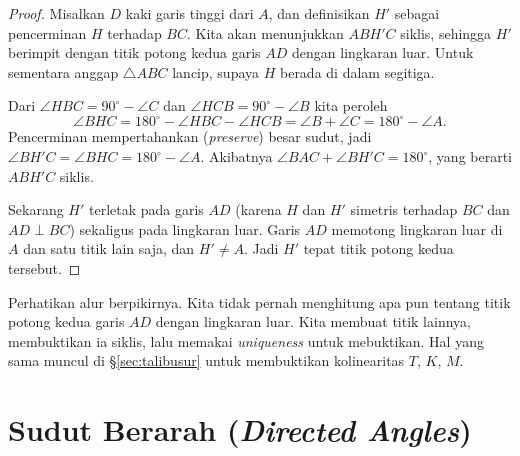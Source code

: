\documentclass[letterpaper, 13pt]{scrartcl}
\begin{document}
\begin{proof}
Misalkan $D$ kaki garis tinggi dari $A$, dan definisikan $H'$ sebagai pencerminan $H$ terhadap $BC$. Kita akan menunjukkan $ABH'C$ siklis, sehingga $H'$ berimpit dengan titik potong kedua garis $AD$ dengan lingkaran luar. Untuk sementara anggap $\triangle ABC$ lancip, supaya $H$ berada di dalam segitiga.

Dari $\angle HBC = 90^\circ - \angle C$ dan $\angle HCB = 90^\circ - \angle B$ kita peroleh
\[
\angle BHC = 180^\circ - \angle HBC - \angle HCB = \angle B + \angle C = 180^\circ - \angle A.
\]
Pencerminan mempertahankan (\textit{preserve}) besar sudut, jadi $\angle BH'C = \angle BHC = 180^\circ - \angle A$. Akibatnya $\angle BAC + \angle BH'C = 180^\circ$, yang berarti $ABH'C$ siklis.

Sekarang $H'$ terletak pada garis $AD$ (karena $H$ dan $H'$ simetris terhadap $BC$ dan $AD \perp BC$) sekaligus pada lingkaran luar. Garis $AD$ memotong lingkaran luar di $A$ dan satu titik lain saja, dan $H' \ne A$. Jadi $H'$ tepat titik potong kedua tersebut.
\end{proof}

Perhatikan alur berpikirnya. Kita tidak pernah menghitung apa pun tentang titik potong kedua garis $AD$ dengan lingkaran luar. Kita membuat titik lainnya, membuktikan ia siklis, lalu memakai \textit{uniqueness} untuk mebuktikan. Hal yang sama muncul di \S\ref{sec:talibusur} untuk membuktikan kolinearitas $T$, $K$, $M$.

\section{Sudut Berarah (\textit{Directed Angles})}
\label{sec:sudut-berarah}
\end{document}
